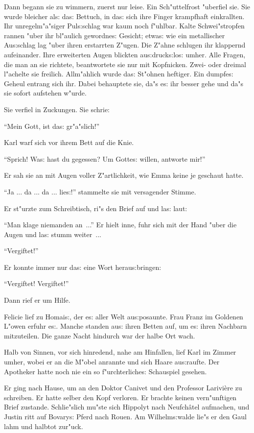 \documentclass[oneside,12pt]{book}
\newcommand{\s}{s:}%
\begin{document}
Dann begann sie zu wimmern, zuerst nur leise. Ein Sch"uttelfrost
"uberfiel sie. Sie wurde bleicher al{\s} da{\s} Bettuch, in da{\s}
sich ihre Finger krampfhaft einkrallten. Ihr unregelm"a"siger
Pul{\s}schlag war kaum noch f"uhlbar. Kalte Schwei"stropfen rannen
"uber ihr bl"aulich gewordne{\s} Gesicht; etwa{\s} wie ein
metallischer Au{\s}schlag lag "uber ihren erstarrten Z"ugen. Die
Z"ahne schlugen ihr klappernd aufeinander. Ihre erweiterten Augen
blickten au{\s}druck{\s}lo{\s} umher. Alle Fragen, die man an sie
richtete, beantwortete sie nur mit Kopfnicken. Zwei- oder dreimal
l"achelte sie freilich. Allm"ahlich wurde da{\s} St"ohnen
heftiger. Ein dumpfe{\s} Geheul entrang sich ihr. Dabei behauptete
sie, da"s e{\s} ihr besser gehe und da"s sie sofort aufstehen
w"urde.

Sie verfiel in Zuckungen. Sie schrie:

"`Mein Gott, ist da{\s} gr"a"slich!"'

Karl warf sich vor ihrem Bett auf die Knie.

"`Sprich! Wa{\s} hast du gegessen? Um Gotte{\s} willen, antworte
mir!"'

Er sah sie an mit Augen voller Z"artlichkeit, wie Emma keine je
geschaut hatte.

"`Ja ... da ... da ... lie{\s}!"' stammelte sie mit versagender
Stimme.

Er st"urzte zum Schreibtisch, ri"s den Brief auf und la{\s} laut:

"`Man klage niemanden an~..."' Er hielt inne, fuhr sich mit der
Hand "uber die Augen und la{\s} stumm weiter~...

"`Vergiftet!"'

Er konnte immer nur da{\s} eine Wort herau{\s}bringen:

"`Vergiftet! Vergiftet!"'

Dann rief er um Hilfe.

Felicie lief zu Homai{\s}, der e{\s} aller Welt au{\s}posaunte.
Frau Franz im Goldenen L"owen erfuhr e{\s}. Manche standen au{\s}
ihren Betten auf, um e{\s} ihren Nachbarn mit\/zuteilen. Die ganze
Nacht hindurch war der halbe Ort wach.

Halb von Sinnen, vor sich hinredend, nahe am Hinfallen, lief Karl
im Zimmer umher, wobei er an die M"obel anrannte und sich Haare
au{\s}raufte. Der Apotheker hatte noch nie ein so f"urchterliche{\s}
Schauspiel gesehen.

Er ging nach Hause, um an den Doktor Canivet und den Professor
Larivi\`ere zu schreiben. Er hatte selber den Kopf verloren. Er
brachte keinen vern"unftigen Brief zustande. Schlie"slich mu"ste
sich Hippolyt nach Neufch\^atel aufmachen, und Justin ritt auf
Bovary{\s} Pferd nach Rouen. Am Wilhelm{\s}walde lie"s er den Gaul
lahm und halbtot zur"uck.
\end{document}
